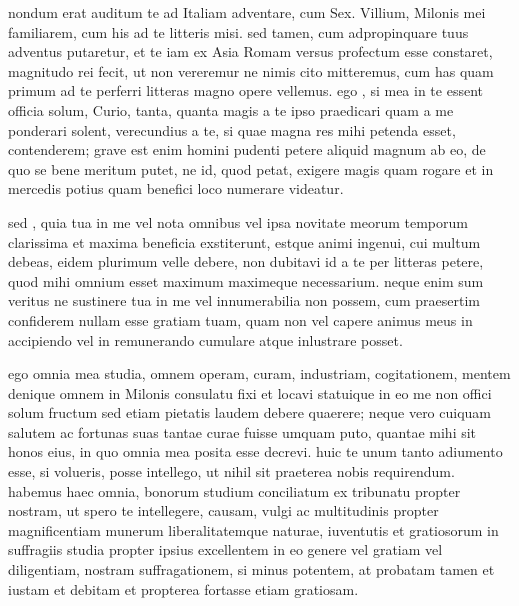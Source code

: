 


 nondum erat auditum te ad Italiam adventare, cum Sex. Villium, Milonis mei familiarem, cum his ad te litteris misi. sed tamen, cum adpropinquare tuus adventus putaretur, et te iam ex Asia Romam versus profectum esse constaret, magnitudo rei fecit, ut non vereremur ne nimis cito mitteremus, cum has quam primum ad te perferri litteras magno opere vellemus. ego , si mea in te essent officia solum, Curio, tanta, quanta magis a te ipso praedicari quam a me ponderari solent, verecundius a te, si quae magna res mihi petenda esset, contenderem; grave est enim homini pudenti petere aliquid magnum ab eo, de quo se bene meritum putet, ne id, quod petat, exigere magis quam rogare et in mercedis potius quam benefici loco numerare videatur.

 sed , quia tua in me vel nota omnibus vel ipsa novitate meorum temporum clarissima et maxima beneficia exstiterunt, estque animi ingenui, cui multum debeas, eidem plurimum velle debere, non dubitavi id a te per litteras petere, quod mihi omnium esset maximum maximeque necessarium. neque enim sum veritus ne sustinere tua in me vel innumerabilia non possem, cum praesertim confiderem nullam esse gratiam tuam, quam non vel capere animus meus in accipiendo vel in remunerando cumulare atque inlustrare posset.

 ego omnia mea studia, omnem operam, curam, industriam, cogitationem, mentem denique omnem in Milonis consulatu fixi et locavi statuique in eo me non offici solum fructum sed etiam pietatis laudem debere quaerere; neque vero cuiquam salutem ac fortunas suas tantae curae fuisse umquam puto, quantae mihi sit honos eius, in quo omnia mea posita esse decrevi. huic te unum tanto adiumento esse, si volueris, posse intellego, ut nihil sit praeterea nobis requirendum. habemus haec omnia, bonorum studium conciliatum ex tribunatu propter nostram, ut spero te intellegere, causam, vulgi ac multitudinis propter magnificentiam munerum liberalitatemque naturae, iuventutis et gratiosorum in suffragiis studia propter ipsius excellentem in eo genere vel gratiam vel diligentiam, nostram suffragationem, si minus potentem, at probatam tamen et iustam et debitam et propterea fortasse etiam gratiosam.

